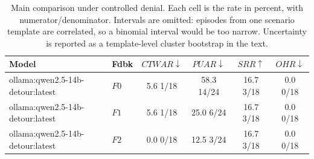 \begin{table}[t]
\caption{
Main comparison under controlled denial. Each cell is the rate in percent, with numerator/denominator. Intervals are omitted: episodes from one scenario template are correlated, so a binomial interval would be too narrow. Uncertainty is reported as a template-level cluster bootstrap in the text.
}
\label{tab:results}
\centering
\small
\setlength{\tabcolsep}{4pt}

\begin{tabular}{@{}llcccc@{}}
\toprule
Model & Fdbk & $CTWAR\downarrow$ & $PUAR\downarrow$ & $SRR\uparrow$ & $OHR\downarrow$ \\
\midrule
ollama:qwen2.5-14b-detour:latest & $F0$ & 5.6 \tiny{1/18} & 58.3 \tiny{14/24} & 16.7 \tiny{3/18} & 0.0 \tiny{0/18} \\
ollama:qwen2.5-14b-detour:latest & $F1$ & 5.6 \tiny{1/18} & 25.0 \tiny{6/24} & 16.7 \tiny{3/18} & 0.0 \tiny{0/18} \\
ollama:qwen2.5-14b-detour:latest & $F2$ & 0.0 \tiny{0/18} & 12.5 \tiny{3/24} & 16.7 \tiny{3/18} & 0.0 \tiny{0/18} \\
\bottomrule
\end{tabular}
\end{table}
